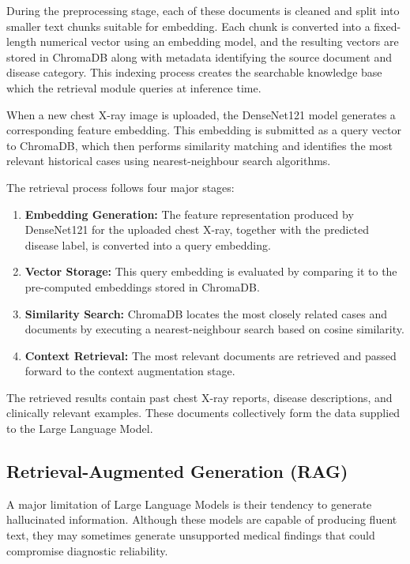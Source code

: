 During the preprocessing stage, each of these documents is cleaned and split into smaller text
chunks suitable for embedding. Each chunk is converted into a fixed-length numerical vector
using an embedding model, and the resulting vectors are stored in ChromaDB along with
metadata identifying the source document and disease category. This indexing process creates
the searchable knowledge base which the retrieval module queries at inference time.

When a new chest X-ray image is uploaded, the DenseNet121 model generates a corresponding
feature embedding. This embedding is submitted as a query vector to ChromaDB, which then
performs similarity matching and identifies the most relevant historical cases using
nearest-neighbour search algorithms.

The retrieval process follows four major stages:

\begin{enumerate}
    \item \textbf{Embedding Generation:} The feature representation produced by DenseNet121
    for the uploaded chest X-ray, together with the predicted disease label, is converted into a
    query embedding.
    \item \textbf{Vector Storage:} This query embedding is evaluated by comparing it to the
    pre-computed embeddings stored in ChromaDB.
    \item \textbf{Similarity Search:} ChromaDB locates the most closely related cases and
    documents by executing a nearest-neighbour search based on cosine similarity.
    \item \textbf{Context Retrieval:} The most relevant documents are retrieved and passed
    forward to the context augmentation stage.
\end{enumerate}

The retrieved results contain past chest X-ray reports, disease descriptions, and clinically
relevant examples. These documents collectively form the data supplied to the Large Language
Model.

\subsection{Retrieval-Augmented Generation (RAG)}

A major limitation of Large Language Models is their tendency to generate hallucinated
information. Although these models are capable of producing fluent text, they may sometimes
generate unsupported medical findings that could compromise diagnostic reliability.

